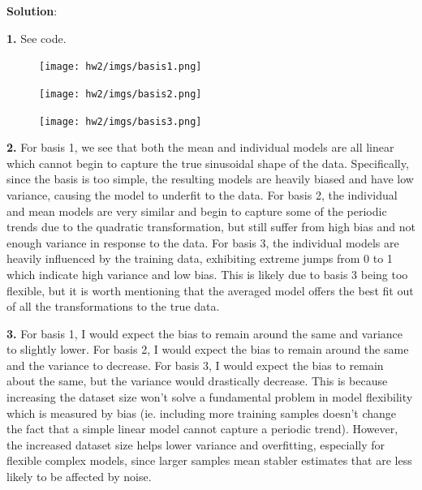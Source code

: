 \documentclass[submit]{../harvardml}
\newenvironment{solution}{
    \vspace{2mm}
    \color{black}\noindent\textbf{Solution}:
}{}
\begin{document}
\begin{solution}
    \begin{tcolorbox}
        \textbf{1.} See code.
    \end{tcolorbox}
    \begin{figure}[H]
        \centering
        \texttt{[image: hw2/imgs/basis1.png]}
    \end{figure}
    \begin{figure}[H]
        \centering
        \texttt{[image: hw2/imgs/basis2.png]}
    \end{figure}
    \begin{figure}[H]
        \centering
        \texttt{[image: hw2/imgs/basis3.png]}
    \end{figure}
    
    \begin{tcolorbox}
        \textbf{2.} For basis 1, we see that both the mean and individual models are all linear which cannot begin to capture the true sinusoidal shape of the data. Specifically, since the basis is too simple, the resulting models are heavily biased and have low variance, causing the model to underfit to the data. For basis 2, the individual and mean models are very similar and begin to capture some of the periodic trends due to the quadratic transformation, but still suffer from high bias and not enough variance in response to the data. For basis 3, the individual models are heavily influenced by the training data, exhibiting extreme jumps from 0 to 1 which indicate high variance and low bias. This is likely due to basis 3 being too flexible, but it is worth mentioning that the averaged model offers the best fit out of all the transformations to the true data.
    \end{tcolorbox}
    \begin{tcolorbox}
        \textbf{3.} For basis 1, I would expect the bias to remain around the same and variance to slightly lower. For basis 2, I would expect the bias to remain around the same and the variance to decrease. For basis 3, I would expect the bias to remain about the same, but the variance would drastically decrease. This is because increasing the dataset size won't solve a fundamental problem in model flexibility which is measured by bias (ie. including more training samples doesn't change the fact that a simple linear model cannot capture a periodic trend). However, the increased dataset size helps lower variance and overfitting, especially for flexible complex models, since larger samples mean stabler estimates that are less likely to be affected by noise.

\end{tcolorbox}
\end{solution}
\end{document}
